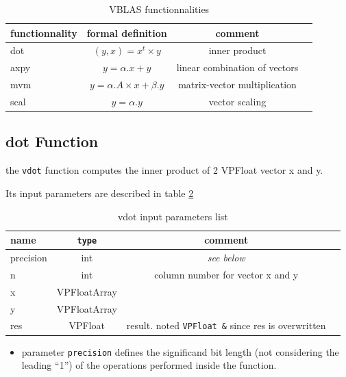 \documentclass[11pt]{report}
\begin{document}
\begin{table}[h!]
  \begin{center}
    \caption{VBLAS functionnalities}
    \label{tab:table4}
    \begin{tabular}{l|c|c|r} %
      \textbf{functionnality} & formal definition & \textbf{comment}\\
      \hline
      dot & $(y, x) = x^t\times y$ & inner product \\
      \hline
      axpy & $ y = \alpha . x + y$ & linear combination of vectors\\
      \hline
      mvm & $ y = \alpha . A \times x + \beta . y$ & matrix-vector multiplication\\
      \hline
      scal & $ y = \alpha . y $ & vector scaling\\ 
    \end{tabular}
  \end{center}
\end{table}

\subsection{dot Function}
the \texttt{vdot} function computes the inner product of 2 VPFloat vector x and y.

Its input parameters are described in table \ref{tab:tablevdot}
\begin{table}[h!]
  \begin{center}
    \caption{vdot input parameters list}
    \label{tab:tablevdot}
    \begin{tabular}{l|c|c|r} %
      \textbf{name} & \texttt{type} & \textbf{comment}\\
      \hline
      precision & int & \emph{see below} \\ 
      \hline
      n & int & column number for vector x and y \\ 
      \hline
      x & VPFloatArray &  \\ 
      \hline
      y & VPFloatArray &  \\ 
      \hline
      res & VPFloat & result. noted \texttt{VPFloat \&} since res is overwritten \\ 
      \hline
    \end{tabular}
  \end{center}
\end{table}
\begin{itemize}
\item parameter \texttt{precision} defines the significand bit length (not considering the leading ``1'') of the operations performed inside the function. 
  \end{itemize}
\end{document}
